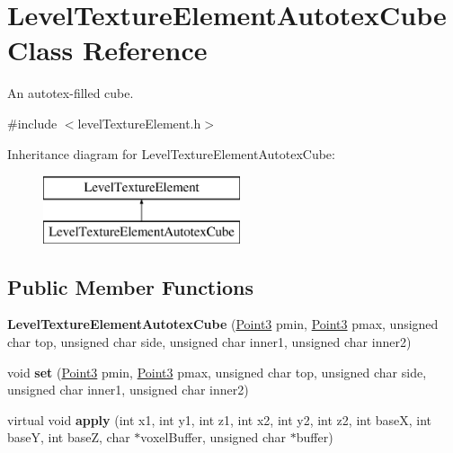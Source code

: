 \hypertarget{classLevelTextureElementAutotexCube}{
\section{\-Level\-Texture\-Element\-Autotex\-Cube \-Class \-Reference}
\label{dc/d4e/classLevelTextureElementAutotexCube}
}


\-An autotex-\/filled cube.  




{\ttfamily \#include $<$level\-Texture\-Element.\-h$>$}

\-Inheritance diagram for \-Level\-Texture\-Element\-Autotex\-Cube\-:\begin{figure}[H]
\begin{center}
\leavevmode
\includegraphics[height=2.000000cm]{dc/d4e/classLevelTextureElementAutotexCube}
\end{center}
\end{figure}
\subsection*{\-Public \-Member \-Functions}
\begin{DoxyCompactItemize}
\item 
\hypertarget{classLevelTextureElementAutotexCube_a08cd51e8e663f645de03f72a0d149080}{
{\bfseries \-Level\-Texture\-Element\-Autotex\-Cube} (\hyperlink{classPoint3}{\-Point3} pmin, \hyperlink{classPoint3}{\-Point3} pmax, unsigned char top, unsigned char side, unsigned char inner1, unsigned char inner2)}
\label{dc/d4e/classLevelTextureElementAutotexCube_a08cd51e8e663f645de03f72a0d149080}

\item 
\hypertarget{classLevelTextureElementAutotexCube_a682f3ec74291aec29e85d70f4a90ecd2}{
void {\bfseries set} (\hyperlink{classPoint3}{\-Point3} pmin, \hyperlink{classPoint3}{\-Point3} pmax, unsigned char top, unsigned char side, unsigned char inner1, unsigned char inner2)}
\label{dc/d4e/classLevelTextureElementAutotexCube_a682f3ec74291aec29e85d70f4a90ecd2}

\item 
\hypertarget{classLevelTextureElementAutotexCube_a6cf4d47dc8327ffcabcec3c318d573e5}{
virtual void {\bfseries apply} (int x1, int y1, int z1, int x2, int y2, int z2, int base\-X, int base\-Y, int base\-Z, char $\ast$voxel\-Buffer, unsigned char $\ast$buffer)}
\label{dc/d4e/classLevelTextureElementAutotexCube_a6cf4d47dc8327ffcabcec3c318d573e5}

\end{DoxyCompactItemize}
